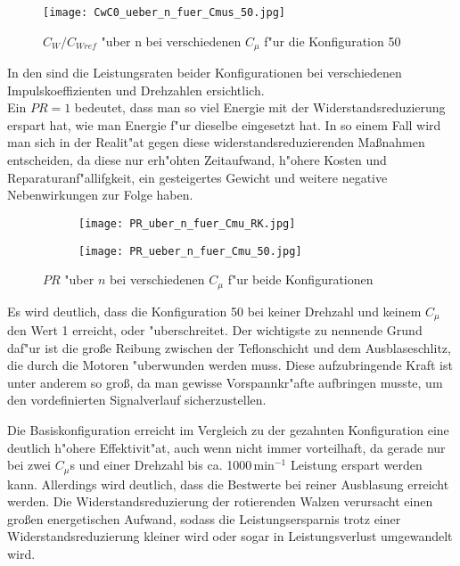 \begin{figure}[h]
	\centering
	\texttt{[image: CwC0\_ueber\_n\_fuer\_Cmus\_50.jpg]}
	\caption{$C_{W}/C_{Wref}$ "uber n bei verschiedenen $C_{\mu}$ f"ur die Konfiguration 50}
	\label{fig:CwCwref/n Cmu 50}
\end{figure}

In den  sind die Leistungsraten beider Konfigurationen bei verschiedenen Impulskoeffizienten und Drehzahlen ersichtlich.\\
Ein $PR= 1$ bedeutet, dass man so viel Energie mit der Widerstandsreduzierung erspart hat, wie man Energie f"ur dieselbe eingesetzt hat. In so einem Fall wird man sich in der Realit"at gegen diese widerstandsreduzierenden Ma\ss{}nahmen entscheiden, da diese nur erh"ohten Zeitaufwand, h"ohere Kosten und Reparaturanf"allifgkeit, ein gesteigertes Gewicht und weitere negative Nebenwirkungen zur Folge haben.

\begin{figure}[h]
	\centering
	\begin{subfigure}[c]{0.45\textwidth}		
		\texttt{[image: PR\_uber\_n\_fuer\_Cmu\_RK.jpg]}
		\label{fig:PR RK}
	\end{subfigure}
	\begin{subfigure}[c]{0.45\textwidth}
		\texttt{[image: PR\_ueber\_n\_fuer\_Cmu\_50.jpg]}
		\label{fig:PR 50}
	\end{subfigure}
		\caption{$PR$ "uber $n$ bei verschiedenen $C_{\mu}$ f"ur beide Konfigurationen}
	\label{fig:PR}
\end{figure}

Es wird deutlich, dass die Konfiguration 50 bei keiner Drehzahl und keinem $C_{\mu}$ den Wert 1 erreicht, oder "uberschreitet. Der wichtigste zu nennende Grund daf"ur ist die gro\ss{}e Reibung zwischen der Teflonschicht und dem Ausblaseschlitz, die durch die Motoren "uberwunden werden muss. Diese aufzubringende Kraft ist unter anderem so gro\ss{}, da man gewisse Vorspannkr"afte aufbringen musste, um den vordefinierten Signalverlauf sicherzustellen.

Die Basiskonfiguration erreicht im Vergleich zu der gezahnten Konfiguration eine deutlich h"ohere Effektivit"at, auch wenn nicht immer vorteilhaft, da gerade nur bei zwei $C_{\mu}$s und einer Drehzahl bis ca. 1000\,$\mathrm{min^{-1}}$ Leistung erspart werden kann. Allerdings wird deutlich, dass die Bestwerte bei reiner Ausblasung erreicht werden. Die Widerstandsreduzierung der rotierenden Walzen verursacht einen gro\ss{}en energetischen Aufwand, sodass die Leistungsersparnis trotz einer Widerstandsreduzierung kleiner wird oder sogar in Leistungsverlust umgewandelt wird.
